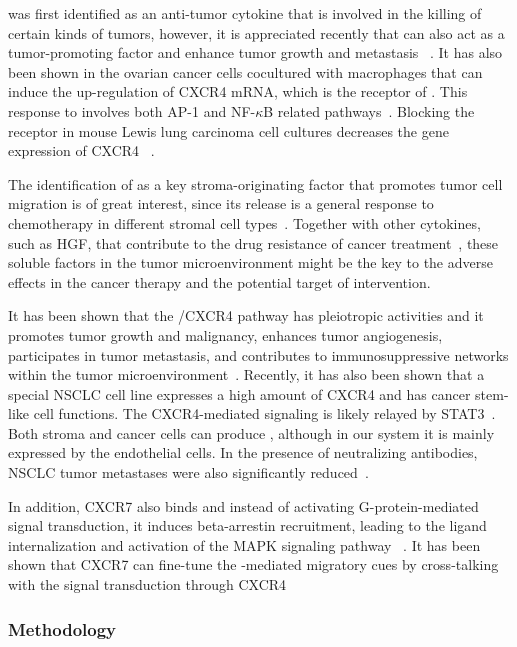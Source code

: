 \tnfa was first identified as an anti-tumor cytokine that is involved in the killing
of certain kinds of tumors, however, it is appreciated recently that \tnfa can also 
act as a tumor-promoting factor and enhance tumor growth and metastasis%
~\citep{Wu2010}. It has also been shown in the ovarian cancer cells cocultured with
macrophages that \tnfa can induce the up-regulation of 
CXCR4 mRNA, which is the receptor of \sdfonea. This response to \tnfa involves both
AP-1 and NF-$\kappa$B related pathways~\citep{Kulbe2005}. Blocking the \tnfa receptor
in mouse Lewis lung carcinoma cell cultures decreases the gene expression of CXCR4~%
\citep{Sasi2011}.

The identification of \tnfa as a key stroma-originating factor that promotes 
tumor cell migration is of great interest, since its release is a general response to chemotherapy in different stromal cell types~\citep{Acharyya2012}. Together with
other cytokines, such as HGF, that contribute to the drug resistance of cancer
treatment~\citep{Straussman2012}, these soluble factors in the tumor microenvironment
might be the key to the adverse effects in the cancer therapy and the potential target of intervention.

It has been shown that the \sdfonea/CXCR4 pathway has pleiotropic activities and it 
promotes tumor growth and malignancy, enhances tumor angiogenesis, participates in tumor metastasis, and contributes to immunosuppressive networks within the tumor microenvironment~\citep{Kryczek2007}. 
Recently, it has also been shown that a special NSCLC cell line expresses a
high amount of CXCR4 and has cancer stem-like cell functions. The CXCR4-mediated
signaling is likely relayed by STAT3~\citep{Jung2013}.
Both stroma and cancer cells can produce \sdfonea, 
although in our system it is mainly expressed by the endothelial cells. In the presence of neutralizing \sdfonea antibodies, NSCLC tumor metastases were also significantly reduced~\citep{Phillips2003}.

In addition, CXCR7 also binds \sdfonea and instead of 
activating G-protein-mediated signal transduction, it induces 
beta-arrestin
recruitment, leading to the ligand internalization and 
activation of the MAPK signaling pathway%
~\citep{Rajagopal2010a}. It has been shown that CXCR7 can
fine-tune the \sdfonea-mediated migratory cues by cross-talking
with the signal transduction through CXCR4%
~\citep{Zabel2009,Liberman2012f}


\subsubsection{Methodology}

